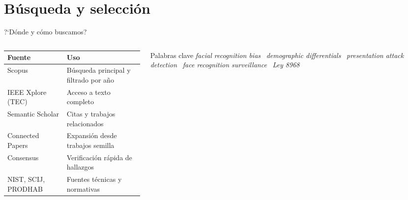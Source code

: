\section{B\'usqueda y selecci\'on}

\begin{frame}{?`D\'onde y c\'omo buscamos?}

  \begin{columns}[T]
    \begin{column}{0.50\textwidth}
      \scriptsize
      \begin{tabularx}{\linewidth}{@{}l Y@{}}
        \toprule
        \textbf{Fuente} & \textbf{Uso}\\
        \midrule
        Scopus & B\'usqueda principal y filtrado por a\~no\\
        IEEE Xplore (TEC) & Acceso a texto completo\\
        Semantic Scholar & Citas y trabajos relacionados\\
        Connected Papers & Expansi\'on desde trabajos semilla\\
        Consensus & Verificaci\'on r\'apida de hallazgos\\
        NIST, SCIJ, PRODHAB & Fuentes t\'ecnicas y normativas\\
        \bottomrule
      \end{tabularx}
    \end{column}
    \begin{column}{0.44\textwidth}
      \begin{block}{Palabras clave}
        \scriptsize
        \textit{facial recognition bias} \textbullet\
        \textit{demographic differentials} \textbullet\
        \textit{presentation attack detection} \textbullet\
        \textit{face recognition surveillance} \textbullet\
        \textit{Ley 8968} \textbullet\
      \end{block}
    \end{column}
  \end{columns}
\end{frame}

